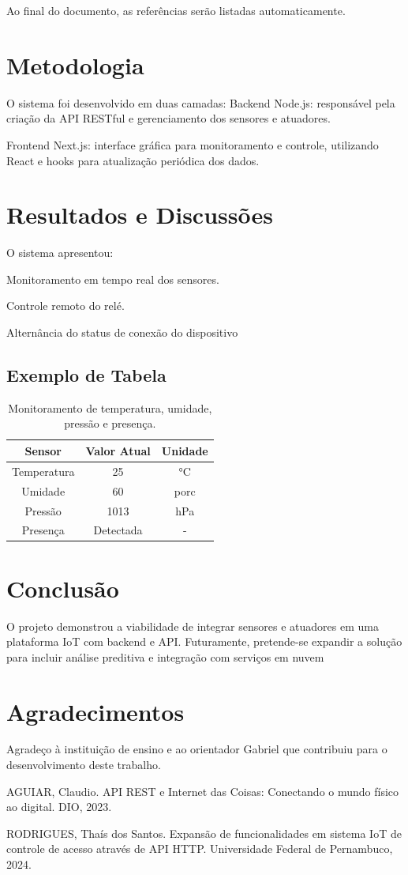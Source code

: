 \documentclass[12pt]{unisenaiclass}
\begin{document}
Ao final do documento, as referências serão listadas automaticamente.

\section{Metodologia}
O sistema foi desenvolvido em duas camadas:
Backend Node.js: responsável pela criação da API RESTful e gerenciamento dos sensores e atuadores.

Frontend Next.js: interface gráfica para monitoramento e controle, utilizando React e hooks para atualização periódica dos dados.





\section{Resultados e Discussões}
O sistema apresentou:

Monitoramento em tempo real dos sensores.

Controle remoto do relé.

Alternância do status de conexão do dispositivo
\subsection{Exemplo de Tabela}


\begin{table}[H]
    \centering
    \caption{ Monitoramento de temperatura, umidade, pressão e presença.}
    \label{tab:exemplo}
    \begin{tabular}{|c|c|c|}
        \hline
        Sensor & Valor Atual & 	Unidade\\ \hline
        Temperatura  & 25 & °C \\ \hline
        Umidade& 60 &  porc \\ \hline
         Pressão & 1013 &  hPa \\ \hline
         Presença & Detectada&  -\\ \hline
         
    
    \end{tabular}
\end{table}

\section{Conclusão}
O projeto demonstrou a viabilidade de integrar sensores e atuadores em uma plataforma IoT com backend e API. Futuramente, pretende-se expandir a solução para incluir análise preditiva e integração com serviços em nuvem
\section*{Agradecimentos}
Agradeço à instituição de ensino e ao orientador Gabriel que contribuiu para o desenvolvimento deste trabalho.


\printbibliography
AGUIAR, Claudio. API REST e Internet das Coisas: Conectando o mundo físico ao digital. DIO, 2023.

RODRIGUES, Thaís dos Santos. Expansão de funcionalidades em sistema IoT de controle de acesso através de API HTTP. Universidade Federal de Pernambuco, 2024.
\end{document}
